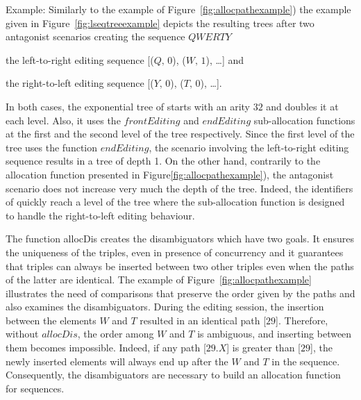 \begin{asparadesc}
\item[Example:] Similarly to the example of Figure~\ref{fig:allocpathexample})
  the example given in Figure~\ref{fig:lseqtreeexample} depicts the resulting
  trees after two antagonist scenarios creating the sequence
  $QWERTY$ \begin{inparaenum}[(i)] \item the left-to-right editing sequence
    [($Q,\,0$), ($W,\,1$), \ldots] and \item the right-to-left editing sequence
    [($Y,\,0$), ($T,\,0$), \ldots]. \end{inparaenum} In both cases, the
  exponential tree of \NAME{} starts with an arity $32$ and doubles it at each
  level. Also, it uses the $frontEditing$ and $endEditing$ sub-allocation
  functions at the first and the second level of the tree respectively. Since
  the first level of the tree uses the function $endEditing$, the scenario
  involving the left-to-right editing sequence results in a tree of depth 1. On
  the other hand, contrarily to the allocation function presented in
  Figure\ref{fig:allocpathexample}), the antagonist scenario does not increase
  very much the depth of the tree. Indeed, the identifiers of \NAME{} quickly
  reach a level of the tree where the sub-allocation function is designed to
  handle the right-to-left editing behaviour.
\end{asparadesc}

\begin{asparadesc}
\item [The function allocDis] creates the di\-sam\-bi\-gua\-tors which have two
  goals.  It ensures the uniqueness of the triples, even in presence of
  concurrency and it guarantees that triples can always be inserted between two
  other triples even when the paths of the latter are identical. The example of
  Figure~\ref{fig:allocpathexample} illustrates the need of comparisons that
  preserve the order given by the paths and also examines the
  disambiguators. During the editing session, the insertion between the
  elements $W$ and $T$ resulted in an identical path [$29$]. Therefore, without
  $allocDis$, the order among $W$ and $T$ is ambiguous, and inserting between
  them becomes impossible. Indeed, if any path [$29.X$] is greater than [$29$],
  the newly inserted elements will always end up after the $W$ and $T$ in the
  sequence. Consequently, the disambiguators are necessary to build an
  allocation function for sequences.
\end{asparadesc}

